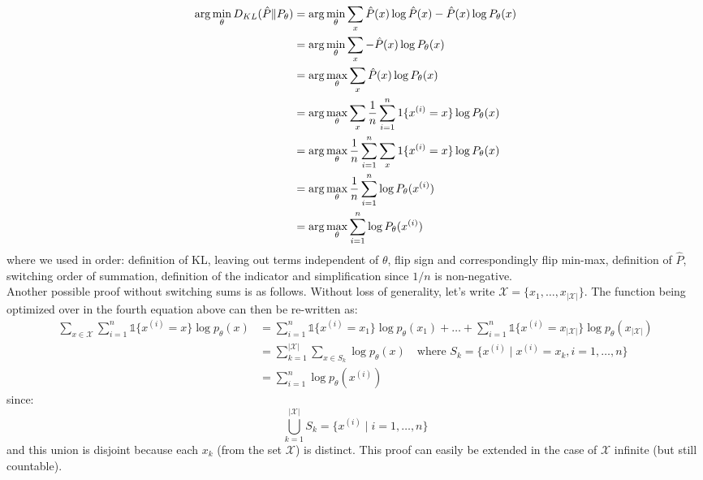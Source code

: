 \begin{answer}
\begin{align*}
\arg\min_\theta D_{KL}(\hat{P}\|P_\theta)
&= \arg\min_\theta \sum_x \hat{P}(x) \log \hat{P}(x) - \hat{P}(x) \log P_\theta(x) \\
&= \arg\min_\theta \sum_x - \hat{P}(x) \log P_\theta(x) \\
&= \arg\max_\theta \sum_x \hat{P}(x) \log P_\theta(x) \\
&= \arg\max_\theta \sum_x \frac{1}{{n}} \sum_{i=1}^{n} 1\{x^{(i)}=x\}\log P_\theta(x)\\
&= \arg\max_\theta \frac{1}{{n}} \sum_{i=1}^{n} \sum_x 1\{x^{(i)}=x\}\log P_\theta(x)\\
&= \arg\max_\theta \frac{1}{{n}} \sum_{i=1}^{n} \log P_\theta(x^{(i)})\\
&= \arg\max_\theta \sum_{i=1}^{n} \log P_\theta(x^{(i)})
\end{align*}
where we used in order: definition of KL, leaving out terms independent of $\theta$, flip sign and correspondingly flip min-max, definition of $\hat{P}$, switching order of summation, definition of the indicator and simplification since $1/n$ is non-negative.\\
Another possible proof without switching sums is as follows. Without loss of generality, let's write $\mathcal{X}=\{x_1, \dots, x_{|\mathcal{X}|}\}$. The function being optimized over in the fourth equation above can then be re-written as:
\begin{align*}
	\sum_{x\in\mathcal{X}}\sum_{i=1}^n \mathds{1}\{x^{(i)}=x\}\log p_{\theta}(x) &= \sum_{i=1}^n \mathds{1}\{x^{(i)}=x_1\}\log p_{\theta}(x_1) + \dots + \sum_{i=1}^n \mathds{1}\{x^{(i)}=x_{|\mathcal{X}|}\} \log p_{\theta}(x_{|\mathcal{X}|})\\
	&= \sum_{k=1}^{|\mathcal{X}|}\sum_{x\in S_k} \log p_\theta(x) \quad \text{where $S_k = \{ x^{(i)} \mid x^{(i)} = x_k, i = 1, \dots, n \} $} \\
	&= \sum_{i=1}^n \log p_\theta(x^{(i)})
\end{align*}
since:
$$ \bigcup_{k=1}^{|\mathcal{X}|}S_k = \{x^{(i)} \mid i = 1, \dots, n\} $$
and this union is disjoint because each $x_k$ (from the set $\mathcal{X}$) is distinct. This proof can easily be extended in the case of $\mathcal{X}$ infinite (but still countable).
\end{answer}
